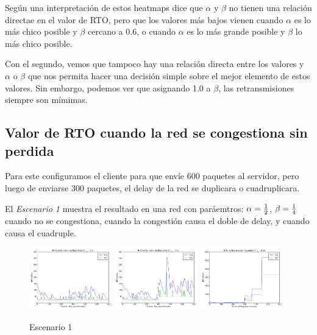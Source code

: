 	Seg\'un una interpretaci\'on de estos heatmaps dice que $\alpha$ y $\beta$
	no tienen una relaci\'on directae en el valor de RTO, pero que los valores
	m\'as bajos vienen cuando $\alpha$ es lo m\'as chico posible y $\beta$
	cercano a $0.6$, o cuando $\alpha$ es lo m\'as grande posible y $\beta$ lo
	m\'as chico posible.

	Con el segundo, vemos que tampoco hay una relaci\'on directa entre los
	valores y $\alpha$ o $\beta$ que nos permita hacer una decisi\'on simple
	sobre el mejor elemento de estos valores. Sin embargo, podemos ver que
	asignando 1.0 a $\beta$, las retransmisiones siempre son m\'imimas.

	\newpage
    \subsection{Valor de RTO cuando la red se congestiona sin perdida}
        Para este configuramos el cliente para que env\'ie 600 paquetes al
        servidor, pero luego de enviarse 300 paquetes, el delay de la red
        se duplicara o cuadruplicara. 
        
        El \emph{Escenario 1} muestra el resultado en una red con
        par\'aemtros: $\alpha={{1}\over{2}}$, $\beta={{1}\over{4}}$
        cuando no se congestiona, cuando la congesti\'on causa el doble de
        delay, y cuando causa el cuadruple.
  
        \begin{figure}[H]
            \center
	        
		    \includegraphics[width=0.32\textwidth]{imagenes/congestion_1.pdf}
		    \includegraphics[width=0.32\textwidth]{imagenes/congestion_2.pdf}
		    \includegraphics[width=0.32\textwidth]{imagenes/congestion_4.pdf}

            \caption*{Escenario 1}
	
        \end{figure}          

